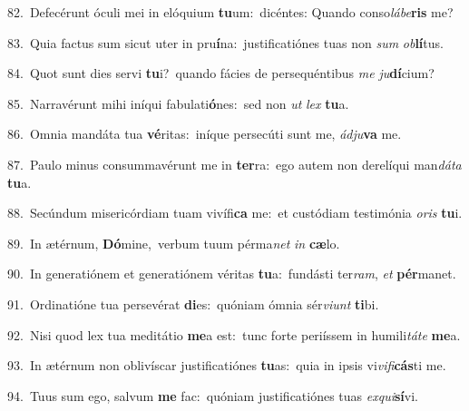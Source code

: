 {\numbfont\textcolor{\numbcolor}{82.}}~Defecérunt óculi mei in elóquium \textbf{tu}\-um:~\star dicéntes: Quando conso\-\textit{lá}\-\textit{be}\textbf{ris} me?\par
{\numbfont\textcolor{\numbcolor}{83.}}~Quia factus sum sicut uter in pru\-\textbf{í}\-na:~\star justificatiónes tuas non \textit{sum} \textit{ob}\-\textbf{lí}tus.\par
{\numbfont\textcolor{\numbcolor}{84.}}~Quot sunt dies servi \textbf{tu}\-i?~\star quando fácies de persequéntibus \textit{me} \textit{ju}\-\textbf{dí}cium?\par
{\numbfont\textcolor{\numbcolor}{85.}}~Narravérunt mihi iníqui fabulati\-\textbf{ó}\-nes:~\star sed non \textit{ut} \textit{lex} \textbf{tu}\-a.\par
{\numbfont\textcolor{\numbcolor}{86.}}~Omnia mandáta tua \textbf{vé}\-ritas:~\star iníque persecúti sunt me, \textit{ád}\-\textit{ju}\textbf{va} me.\par
{\numbfont\textcolor{\numbcolor}{87.}}~Paulo minus consummavérunt me in \textbf{ter}\-ra:~\star ego autem non derelíqui man\-\textit{dá}\-\textit{ta} \textbf{tu}\-a.\par
{\numbfont\textcolor{\numbcolor}{88.}}~Secúndum misericórdiam tuam vivífi\textbf{ca} me:~\star et custódiam testimónia \textit{o}\-\textit{ris} \textbf{tu}\-i.\par
{\numbfont\textcolor{\numbcolor}{89.}}~In ætérnum, \textbf{Dó}\-mine,~\star verbum tuum pérma\textit{net} \textit{in} \textbf{cæ}\-lo.\par
{\numbfont\textcolor{\numbcolor}{90.}}~In generatiónem et generatiónem véritas \textbf{tu}\-a:~\star fundásti ter\-\textit{ram}\-, \textit{et} \textbf{pér}\-manet.\par
{\numbfont\textcolor{\numbcolor}{91.}}~Ordinatióne tua persevérat \textbf{di}\-es:~\star quóniam ómnia sér\-\textit{vi}\-\textit{unt} \textbf{ti}\-bi.\par
{\numbfont\textcolor{\numbcolor}{92.}}~Nisi quod lex tua meditátio \textbf{me}\-a est:~\star tunc forte periíssem in humili\-\textit{tá}\-\textit{te} \textbf{me}\-a.\par
{\numbfont\textcolor{\numbcolor}{93.}}~In ætérnum non oblivíscar justificatiónes \textbf{tu}\-as:~\star quia in ipsis vi\-\textit{vi}\-\textit{fi}\textbf{cás}ti me.\par
{\numbfont\textcolor{\numbcolor}{94.}}~Tuus sum ego, salvum \textbf{me} fac:~\star quóniam justificatiónes tuas \textit{ex}\-\textit{qui}\textbf{sí}vi.\par
